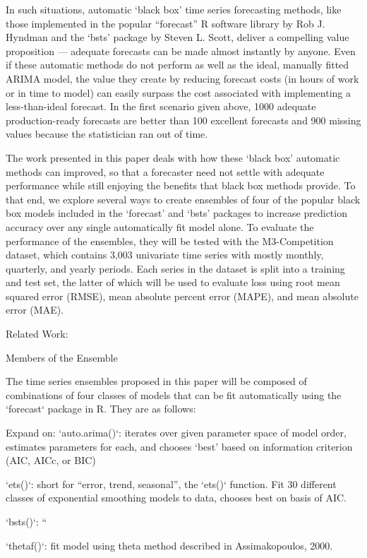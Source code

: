 \documentclass [M] {uclathes}
\begin{document}
In such situations, automatic ‘black box’ time series forecasting methods, like those implemented in the popular “forecast” R software library by Rob J. Hyndman and the ‘bsts’ package by Steven L. Scott, deliver a compelling value proposition — adequate forecasts can be made almost instantly by anyone. Even if these automatic methods do not perform as well as the ideal, manually fitted ARIMA model,  the value they create by reducing forecast costs (in hours of work or in time to model) can easily surpass the cost associated with implementing a less-than-ideal forecast. In the first scenario given above, 1000 adequate production-ready forecasts are better than 100 excellent forecasts and 900 missing values because the statistician ran out of time.

The work presented in this paper deals with how these ‘black box’ automatic methods can improved, so that a forecaster need not settle with adequate performance while still enjoying the benefits that black box methods provide. To that end, we explore several ways to create ensembles of four of the popular black box models included in the ‘forecast’ and ‘bsts’ packages to increase prediction accuracy over any single automatically fit model alone. To evaluate the performance of the ensembles, they will be tested with the M3-Competition dataset, which contains 3,003 univariate time series with mostly monthly, quarterly, and yearly periods. Each series in the dataset is split into a training and test set, the latter of which will be used to evaluate loss using root mean squared error (RMSE), mean absolute percent error (MAPE), and mean absolute error (MAE).

Related Work:

Members of the Ensemble

The time series ensembles proposed in this paper will be composed of combinations of four classes of models that can be fit automatically using the `forecast` package in R. They are as follows:

Expand on:
`auto.arima()`: iterates over given parameter space of model order, estimates parameters for each, and chooses ‘best’ based on information criterion (AIC,  AICc, or BIC)

`ets()`: short for “error, trend, seasonal”, the `ets()` function. Fit 30 different classes of exponential smoothing models to data, chooses best on basis of AIC.

`bsts()`: “

`thetaf()`: fit model using theta method described in Assimakopoulos, 2000.
\end{document}
